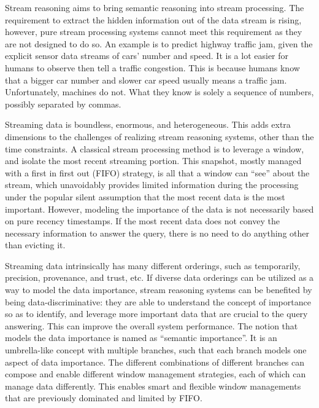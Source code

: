  
Stream reasoning aims to bring semantic reasoning into stream processing. 
The requirement to extract the hidden information out of the data stream is rising, 
however, pure stream processing systems cannot meet this requirement as they are not designed to do so.  
An example is to predict highway traffic jam, given the explicit sensor data streams of cars' number and speed.
It is a lot easier for humans to observe then tell a traffic congestion.
This is because humans know that a bigger car number and slower car speed usually means a traffic jam. 
Unfortunately, machines do not.
What they know is solely a sequence of numbers, possibly separated by commas.

Streaming data is boundless, enormous, and heterogeneous.
This adds extra dimensions to the challenges of realizing stream reasoning systems, other than the time constraints.
A classical stream processing method is to leverage a window, and isolate the most recent streaming portion. 
This snapshot, mostly managed with a first in first out (FIFO) strategy, is all that a window can ``see'' about the stream, 
which unavoidably provides limited information during the processing under the popular silent assumption that the most recent data is the most important.
However, modeling the importance of the data is not necessarily based on pure recency timestamps. 
If the most recent data does not convey the necessary information to answer the query, there is no need to do anything other than evicting it. 

Streaming data intrinsically has many different orderings, such as temporarily, precision, provenance, and trust, etc.
If diverse data orderings can be utilized as a way to model the data importance, stream reasoning systems can be benefited by being data-discriminative: 
they are able to understand the concept of importance so as to identify, and leverage more important data that are crucial to the query answering.
This can improve the overall system performance.
The notion that models the data importance is named as ``semantic importance''.
It is an umbrella-like concept with multiple branches, such that each branch models one aspect of data importance.
The different combinations of different branches can compose and enable different window management strategies, each of which can manage data differently. 
This enables smart and flexible window managements that are previously dominated and limited by FIFO.


